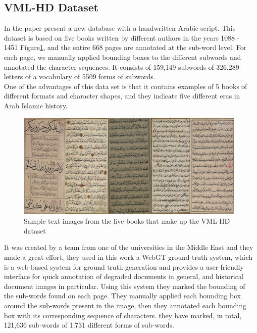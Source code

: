 \subsection{VML-HD Dataset}
In the paper \cite{VMLHD} present a new database with a handwritten Arabic script. This dataset is based on five books written by different authors in the years 1088 - 1451 Figure\ref{fig:VML-HD sample dataset}, and the entire 668 pages are annotated at the sub-word level. For each page, we manually applied bounding boxes to the different subwords and annotated the character sequences. It consists of 159,149 subwords of 326,289 letters of a vocabulary of 5509 forms of subwords. \\
One of the advantages of this data set is that it contains examples of 5 books of different formats and character shapes, and they indicate five different eras in Arab Islamic history. \\

\begin{figure}[!htb]
    \centering
    \includegraphics[width=13cm]{images/vml-hd-sample.PNG}
    \caption{Sample text images from the five books that make up the VML-HD dataset}
    \label{fig:VML-HD sample dataset}
\end{figure}


It was created by a team from one of the universities in the Middle East and they made a great effort, they used in this work a WebGT ground truth system\cite{biller2013webgt}, which is a web-based system for ground truth generation and provides a user-friendly interface for quick annotation of degraded documents in general, and historical document images in particular. Using this system they marked the bounding of the sub-words found on each page. They manually applied each bounding box around the sub-words present in the image, then they annotated each bounding box with its corresponding sequence of characters. they have marked, in total, 121,636 sub-words of 1,731 different forms of sub-words\cite{VMLHD}. \\

